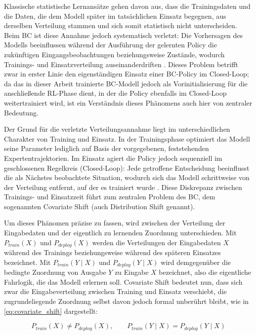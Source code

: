 Klassische statistische Lernansätze gehen davon aus, dass die Trainingsdaten und die Daten, die dem Modell später im tatsächlichen Einsatz begegnen, aus derselben Verteilung stammen und sich somit statistisch nicht unterscheiden. 
Beim \gls{BC} ist diese Annahme jedoch systematisch verletzt: Die Vorhersagen des Modells beeinflussen während der Ausführung der gelernten Policy die zukünftigen Eingangsbeobachtungen beziehungsweise Zustände, wodurch Trainings- und Einsatzverteilung auseinanderdriften \cite[vgl.~S.~1]{chap2_Ros10}. 
Dieses Problem betrifft zwar in erster Linie den eigenständigen Einsatz einer \gls{BC}-Policy im Closed-Loop; da das in dieser Arbeit trainierte \gls{BC}-Modell jedoch als Vorinitialisierung für die anschließende \gls{RL}-Phase dient, in der die Policy ebenfalls im Closed-Loop weitertrainiert wird, ist ein Verständnis dieses Phänomens auch hier von zentraler Bedeutung.

Der Grund für die verletzte Verteilungsannahme liegt im unterschiedlichen Charakter von Training und Einsatz. 
In der Trainingsphase optimiert das Modell seine Parameter lediglich auf Basis der vorgegebenen, feststehenden Expertentrajektorien. 
Im Einsatz agiert die Policy jedoch sequenziell im geschlossenen Regelkreis (Closed-Loop): Jede getroffene Entscheidung beeinflusst die als Nächstes beobachtete Situation, wodurch sich das Modell schrittweise von der Verteilung entfernt, auf der es trainiert wurde \cite[vgl.~S.~3]{chap2_Kar25}. 
Diese Diskrepanz zwischen Trainings- und Einsatzzeit führt zum zentralen Problem des \gls{BC}, dem sogenannten Covariate Shift (auch Distribution Shift genannt).

Um dieses Phänomen präzise zu fassen, wird zwischen der Verteilung der Eingabedaten und der eigentlich zu lernenden Zuordnung unterschieden. 
Mit $P_{train}(X)$ und $P_{deploy}(X)$ werden die Verteilungen der Eingabedaten $X$ während des Trainings beziehungsweise während des späteren Einsatzes bezeichnet. 
Mit $P_{train}(Y \mid X)$ und $P_{deploy}(Y \mid X)$ wird demgegenüber die bedingte Zuordnung von Ausgabe $Y$ zu Eingabe $X$ bezeichnet, also die eigentliche Fahrlogik, die das Modell erlernen soll. 
Covariate Shift bedeutet nun, dass sich zwar die Eingabeverteilung zwischen Training und Einsatz verschiebt, die zugrundeliegende Zuordnung selbst davon jedoch formal unberührt bleibt, wie in \autoref{eq:covariate_shift} dargestellt:

\begin{equation} \label{eq:covariate_shift}
P_{train}(X) \neq P_{deploy}(X), \qquad P_{train}(Y\mid X) = P_{deploy}(Y\mid X)
\end{equation}

